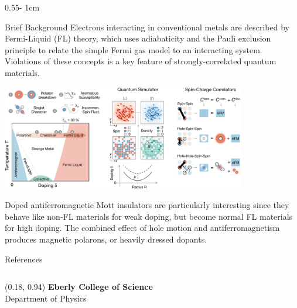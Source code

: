 \documentclass{../psuposter}
\begin{document}
\begin{frame}
\begin{columns}[t, totalwidth=\textwidth]
\begin{column}{0.55\textwidth - 1cm}
    \begin{block}{Brief Background}
    	Electrons interacting in conventional metals are described by Fermi-Liquid (FL) theory, which uses adiabaticity and the Pauli exclusion principle to relate the simple Fermi gas model to an interacting system. Violations of these concepts is a key feature of strongly-correlated quantum materials.
    	\cite{koepsellMicroscopicEvolutionDoped2020} 
        \begin{center}
		   	\includegraphics[width=0.8\textwidth]{images/mott-2}    		
    	\end{center}
		Doped antiferromagnetic Mott insulators are particularly interesting since they behave like non-FL materials for weak doping, but become normal FL materials for high doping. The combined effect of hole motion and antiferromagnetism produces magnetic polarons, or heavily dressed dopants.
		\cite{koepsellMicroscopicEvolutionDoped2020} 
    \end{block}


    \begin{block}{References}
        
%        
		
    \end{block}

\end{column}
\end{columns}


\begin{textblock}{0.5}(0.18, 0.94)
    \color{white}
    \sffamily
    \textbf{Eberly College of Science}
    \\
    Department of Physics
\end{textblock}


\end{frame}
\end{document}
